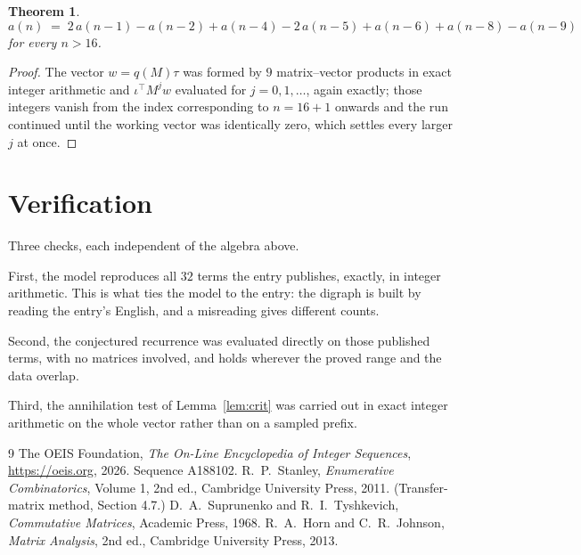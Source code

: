 \documentclass[11pt,a4paper]{article}
\theoremstyle{plain}
\newtheorem{theorem}{Theorem}
\theoremstyle{definition}
\begin{document}
\begin{theorem}
\[
a(n)\;=\;2\,a(n-1) - a(n-2) + a(n-4) - 2\,a(n-5) + a(n-6) + a(n-8) - a(n-9)
\]
for every $n>16$.
\end{theorem}

\begin{proof}
The vector $w=q(M)\tau$ was formed by $9$ matrix--vector products in exact integer
arithmetic and $\iota^{\!\top}M^{j}w$ evaluated for $j=0,1,\dots$, again exactly; those
integers vanish from the index corresponding to $n=16+1$ onwards and the run continued
until the working vector was identically zero, which settles every larger $j$ at once.
\end{proof}

\section{Verification}

Three checks, each independent of the algebra above.

First, the model reproduces all $32$ terms the entry publishes, exactly, in integer
arithmetic. This is what ties the model to the entry: the digraph is built by reading the
entry's English, and a misreading gives different counts.

Second, the conjectured recurrence was evaluated directly on those published terms, with no
matrices involved, and holds wherever the proved range and the data overlap.

Third, the annihilation test of Lemma~\ref{lem:crit} was carried out in exact integer
arithmetic on the whole vector rather than on a sampled prefix.

\begin{thebibliography}{9}
 The OEIS Foundation, \emph{The On-Line Encyclopedia of Integer
Sequences}, \url{https://oeis.org}, 2026. Sequence A188102.
 R.~P.~Stanley, \emph{Enumerative Combinatorics}, Volume 1, 2nd ed.,
Cambridge University Press, 2011. (Transfer-matrix method, Section 4.7.)
 D.~A.~Suprunenko and R.~I.~Tyshkevich, \emph{Commutative Matrices},
Academic Press, 1968.
 R.~A.~Horn and C.~R.~Johnson, \emph{Matrix Analysis}, 2nd ed., Cambridge
University Press, 2013.
\end{thebibliography}
\end{document}
